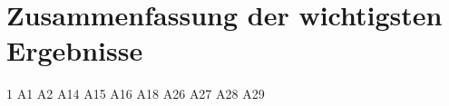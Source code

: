 \section{Zusammenfassung der wichtigsten Ergebnisse}\label{sec:ZusammenfassungErgebnisse}
1 \cite{1}
 \cite{2}
 \cite{3}
 \cite{5}
 \cite{6}
 \cite{7}
 \cite{8}
 \cite{9}
 \cite{10}
 \cite{11}
 \cite{12}
 \cite{13}
 \cite{14}
 \cite{15}
 \cite{16}
 \cite{17}
 \cite{19}
 \cite{20}
 \cite{21}
 \cite{22}
 \cite{23}
 \cite{24}
 \cite{25}
 \cite{26}
 \cite{27}
 \cite{28}
 \cite{29}
 \cite{30}
 \cite{31}
 \cite{32}
 \cite{33}
\newline
A1 \cite{A1}
\newline
A2 \cite{A2}
\newline
A14 \cite{A14}
\newline
A15 \cite{A15}
\newline
A16 \cite{A16}
\newline
A18 \cite{A18}
\newline
A26 \cite{A26}
\newline
A27 \cite{A27}
\newline
A28 \cite{A28}
\newline
A29 \cite{A29}
\newline
